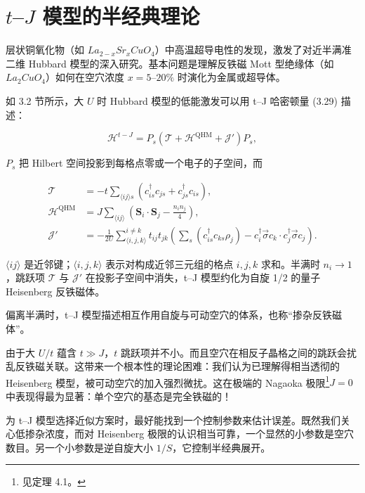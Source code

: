 \chapter{$t$--$J$ 模型的半经典理论}

层状铜氧化物（如 $La_{2-x}Sr_{x}CuO_{4}$）中高温超导电性的发现，激发了对近半满准二维 Hubbard 模型的深入研究。基本问题是理解反铁磁 Mott 型绝缘体（如 $La_{2}CuO_{4}$）如何在空穴浓度 $x=5$--$20\%$ 时演化为金属或超导体。

如 3.2 节所示，大 $U$ 时 Hubbard 模型的低能激发可以用 t--J 哈密顿量 (3.29) 描述：

\begin{equation*}
\mathcal {H} ^ {t - J} = P _ {s} \left( \mathcal {T} + \mathcal {H} ^ {\mathrm{QHM}} + \mathcal {J} ' \right) P _ {s} ,
\tag{19.1}
\end{equation*}

$P_{s}$ 把 Hilbert 空间投影到每格点零或一个电子的子空间，而

\begin{align*}
\mathcal {T} & = - t \sum_{\langle ij \rangle s} \left( c _ {is} ^ {\dagger} c _ {js} + c _ {js} ^ {\dagger} c _ {is} \right) ,\\
\mathcal {H} ^ {\mathrm{QHM}} & = J \sum_{\langle ij \rangle} \left( \mathbf {S} _ {i} \cdot \mathbf {S} _ {j} - \frac {n _ {i} n _ {j}}{4} \right) ,\\
\mathcal {J} ' & = - \frac {1}{2 U} \sum_{\langle i, j, k \rangle} ^ {i \neq k} t _ {ij} t _ {jk} \left( \sum_ {s} \left( c _ {is} ^ {\dagger} c _ {ks} \rho_ {j} \right) - c _ {i} ^ {\dagger} \vec {\sigma} c _ {k} \cdot c _ {j} ^ {\dagger} \vec {\sigma} c _ {j} \right) .
\tag{19.2}
\end{align*}

$\langle ij\rangle$ 是近邻键；$\langle i,j,k\rangle$ 表示对构成近邻三元组的格点 $i,j,k$ 求和。半满时 $n_{i}\to1$，跳跃项 $\mathcal{T}$ 与 $\mathcal{J}'$ 在投影子空间中消失，t--J 模型约化为自旋 1/2 的量子 Heisenberg 反铁磁体。

偏离半满时，t--J 模型描述相互作用自旋与可动空穴的体系，也称“掺杂反铁磁体”。

由于大 $U/t$ 蕴含 $t \gg J$，$t$ 跳跃项并不小。而且空穴在相反子晶格之间的跳跃会扰乱反铁磁关联。这带来一个根本性的理论困难：我们认为已理解得相当透彻的 Heisenberg 模型，被可动空穴的加入强烈微扰。这在极端的 Nagaoka 极限\footnote{见定理 4.1。}$J = 0$ 中表现得最为显著：单个空穴的基态是完全铁磁的！

为 t--J 模型选择近似方案时，最好能找到一个控制参数来估计误差。既然我们关心低掺杂浓度，而对 Heisenberg 极限的认识相当可靠，一个显然的小参数是空穴数目。另一个小参数是逆自旋大小 $1/S$，它控制半经典展开。


